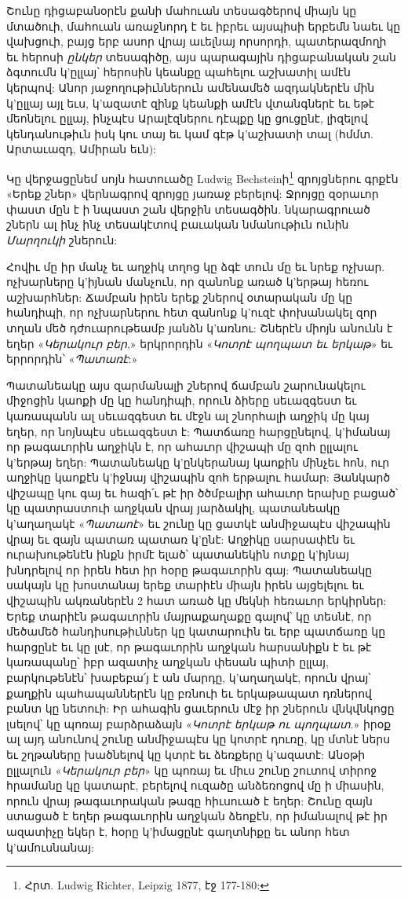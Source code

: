 \documentclass{article}
\begin{document}
{Շունը դիցաբանօրէն քանի մահուան տեսագծերով միայն կը մտածուի, մահուան առաջնորդ է եւ իբրեւ այսպիսի երբեմն նաեւ կը վախցուի, բայց երբ ասոր վրայ աւելնայ որսորդի, պատերազմողի եւ հերոսի \emph{ընկեր} տեսագիծը, այս պարագային դիցաբանական շան ձգտումն կ'ըլլայ՝ հերոսին կեանքը պահելու աշխատիլ ամէն կերպով: Անոր յաջողութիւններուն ամենամեծ ազդակներէն մին կ'ըլլայ այլ եւս, կ'ազատէ զինք կեանքի ամէն վտանգներէ եւ եթէ մեոնելու ըլլայ, ինչպէս Արալէզներու դէպքը կը ցուցընէ, լիզելով կենդանութիւն իսկ կու տայ եւ կամ գէթ կ'աշխատի տալ (հմմտ. Արտաւազդ, Ամիրան եւն):

Կը վերջացընեմ սոյն հատուածը Ludwig Bechsteinի\footnote{Հրտ. Ludwig Richter, Leipzig 1877, էջ 177-180:} զրոյցներու գրքէն «Երեք շներ» վերնագրով զրոյցը յառաջ բերելով: Ջրոյցը զօրաւոր փաստ մըն է ի նպաստ շան վերջին տեսագծին. նկարագրուած շներն ալ ինչ ինչ տեսակէտով բաւական նմանութիւն ունին \emph{Մարղուկի} շներուն:

Հովիւ մը իր մանչ եւ աղջիկ տղոց կը ձգէ տուն մը եւ նրեք ոչխար. ոչխարները կ'իյնան մանչուն, որ զանոնք առած կ'երթայ հեռու աշխարհներ: Ճամբան իրեն երեք շներով օտարական մը կը հանդիպի, որ ոչխարներու հետ զանոնք կ'ուզէ փոխանակել զոր տղան մեծ դժուարութեամբ յանձն կ'առնու: Շներէն միոյն անունն է եղեր «\emph{Կերակուր բեր},» երկրորդին «\emph{Կոտրէ պողպատ եւ երկաթ}» եւ երրորդին՝ «\emph{Պատառէ}:»

Պատանեակը այս զարմանալի շներով ճամբան շարունակելու միջոցին կաոքի մը կը հանդիպի, որուն ձիերը սեւազգեստ եւ կառապանն ալ սեւազգեստ եւ մէջն ալ շնորհալի աղջիկ մը կայ եղեր, որ նոյնպէս սեւազգեստ է: Պատճառը հարցընելով, կ'իմանայ որ թագաւորին աղջիկն է, որ ահաւոր վիշապի մը զոհ ըլլալու կ'երթայ եղեր: Պատանեակը կ'ընկերանայ կաոքին մինչեւ հոն, ուր աղջիկը կաոքէն կ'իջնայ վիշապին զոհ երթալու համար: Յանկարծ վիշապը կու գայ եւ հազի՛ւ թէ իր ծծմբալիր ահաւոր երախը բացած՝ կը պատրաստուի աղջկան վրայ յարձակիլ, պատանեակը կ'աղաղակէ «\emph{Պատաոէ}» եւ շունը կը ցատկէ անմիջապէս վիշապին վրայ եւ զայն պատառ պատառ կ'ընէ: Աղջիկը սարսափէն եւ ուրախութենէն ինքն իրմէ ելած՝ պատանեկին ոտքը կ'իյնայ խնդրելով որ իրեն հետ իր հօրը թագաւորին գայ: Պատանեակը սակայն կը խոստանայ երեք տարիէն միայն իրեն այցելելու եւ վիշապին ակռաներէն 2 հատ առած կը մեկնի հեռաւոր երկիրներ: Երեք տարիէն թագաւորին մայրաքաղաքը գալով՝ կը տեսնէ, որ մեծամեծ հանդիսութիւններ կը կատարուին եւ երբ պատճառը կը հարցընէ եւ կը լսէ, որ թագաւորին աղջկան հարսանիքն է եւ թէ կառապանը՝ իբր ազատիչ աղջկան փեսան պիտի ըլլայ, բարկութենէն՝ խաբեբա՛յ է ան մարդը, կ'աղաղակէ, որուն վրայ՝ քաղքին պահապաններէն կը բռնուի եւ երկաթապատ դռներով բանտ կը նետուի: Իր ահագին ցաւերուն մէջ իր շներուն վնկվնկոցը լսելով՝ կը պոռայ բարձրաձայն «\emph{Կոտրէ երկաթ ու պողպատ}.» իրօք ալ այդ անունով շունը անմիջապէս կը կոտրէ դուռը, կը մտնէ ներս եւ շղթաները խածնելով կը կտրէ եւ ձեռքերը կ'ազատէ: Անօթի ըլլալուն «\emph{Կերակուր բեր}» կը պոռայ եւ միւս շունը շուտով տիրոջ հրամանը կը կատարէ, բերելով ուզածը անձեռոցով մը ի միասին, որուն վրայ թագաւորական թագը հիւսուած է եղեր: Շունը զայն ստացած է եղեր թագաւորին աղջկան ձեոքէն, որ իմանալով թէ իր ազատիչը եկեր է, հօրը կ'իմացընէ գաղտնիքը եւ անոր հետ կ'ամուսնանայ:

}
\end{document}
